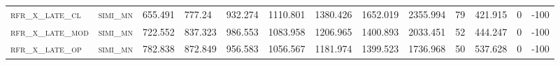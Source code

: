 \begin{landscape}
\begin{center}
\begin{footnotesize}
\begin{longtable}{lllllllllllll}
\textsc{rfr\_x\_late\_cl  } & \textsc{simi\_mn  }   & 655.491 & 777.24  & 932.274  & 1110.801 & 1380.426 & 1652.019 & 2355.994 & 79   & 421.915 & 0   & -100  \\
\textsc{rfr\_x\_late\_mod } & \textsc{simi\_mn  }   & 722.552 & 837.323 & 986.553  & 1083.958 & 1206.965 & 1400.893 & 2033.451 & 52   & 444.247 & 0   & -100  \\
\textsc{rfr\_x\_late\_op  } & \textsc{simi\_mn  }   & 782.838 & 872.849 & 956.583  & 1056.567 & 1181.974 & 1399.523 & 1736.968 & 50   & 537.628 & 0   & -100  \\%

\end{longtable}
\end{footnotesize}
\end{center}
\end{landscape}

\restoregeometry
\pagestyle{headings}


